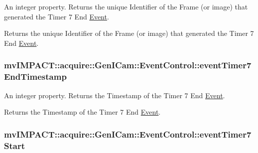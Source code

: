 An integer property. Returns the unique Identifier of the Frame (or image) that generated the Timer 7 End \hyperlink{classmv_i_m_p_a_c_t_1_1acquire_1_1_event}{Event}. 

Returns the unique Identifier of the Frame (or image) that generated the Timer 7 End \hyperlink{classmv_i_m_p_a_c_t_1_1acquire_1_1_event}{Event}. \hypertarget{classmv_i_m_p_a_c_t_1_1acquire_1_1_gen_i_cam_1_1_event_control_aa69ebc3ac27d93b4cd92f415de3add35}{
\subsubsection[{event\+Timer7\+End\+Timestamp}]{ mv\+I\+M\+P\+A\+C\+T\+::acquire\+::\+Gen\+I\+Cam\+::\+Event\+Control\+::event\+Timer7\+End\+Timestamp}}\label{classmv_i_m_p_a_c_t_1_1acquire_1_1_gen_i_cam_1_1_event_control_aa69ebc3ac27d93b4cd92f415de3add35}


An integer property. Returns the Timestamp of the Timer 7 End \hyperlink{classmv_i_m_p_a_c_t_1_1acquire_1_1_event}{Event}. 

Returns the Timestamp of the Timer 7 End \hyperlink{classmv_i_m_p_a_c_t_1_1acquire_1_1_event}{Event}. \hypertarget{classmv_i_m_p_a_c_t_1_1acquire_1_1_gen_i_cam_1_1_event_control_a901a6f456478fc606ac735d9107499e6}{
\subsubsection[{event\+Timer7\+Start}]{ mv\+I\+M\+P\+A\+C\+T\+::acquire\+::\+Gen\+I\+Cam\+::\+Event\+Control\+::event\+Timer7\+Start}}\label{classmv_i_m_p_a_c_t_1_1acquire_1_1_gen_i_cam_1_1_event_control_a901a6f456478fc606ac735d9107499e6}


